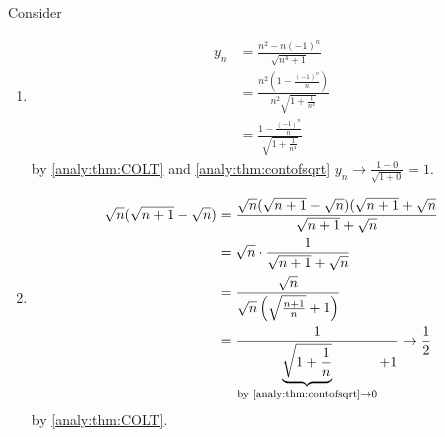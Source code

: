 \documentclass[10pt, a4paper]{article}
\begin{document}
\begin{example}
    Consider
    \begin{enumerate}[label = (\alph*)]
        \item 
        \begin{align*}
            y_n &= \frac{n ^ 2 - n(-1) ^ n}{\sqrt{n ^ 4 + 1}} \\
            &= \frac{n ^ 2 \left(1 - \frac{(-1) ^ n}{n}\right)}{n ^ 2 \sqrt{1 + \frac{1}{n ^ 4}}} \\
            &= \frac{1 - \frac{(-1) ^ n}{n}}{\sqrt{1 + \frac{1}{n ^ 4}}}
        \end{align*}
        by \autoref{analy:thm:COLT} and \autoref{analy:thm:contofsqrt} $y_n \to \frac{1 - 0}{\sqrt{1 + 0}} = 1$.
        \item
        \begin{align*}
            \sqrt{n}(\sqrt{n + 1} - \sqrt{n}) &= \frac{\sqrt{n}(\sqrt{n + 1} - \sqrt{n})(\sqrt{n + 1} + \sqrt{n}}{\sqrt{n + 1} + \sqrt{n}} \\
            &= \sqrt{n} \cdot \frac{1}{\sqrt{n + 1} + \sqrt{n}} \\
            &= \frac{\sqrt{n}}{\sqrt{n}\left(\sqrt{\frac{n + 1}{n}} + 1\right)} \\
            &= \frac{1}{\underbrace{\sqrt{1 + \frac{1}{n}}}_{\text{by \autoref{analy:thm:contofsqrt}} \to 0} + 1} \to \frac{1}{2}
        \end{align*}
        by \autoref{analy:thm:COLT}.
    \end{enumerate}
\end{example}
\end{document}
